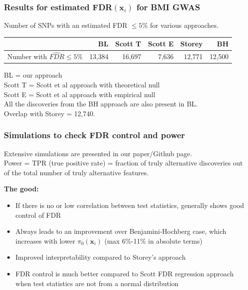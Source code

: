 \documentclass{beamer}
\newcommand{\bx}{\mathbf{x}}
\begin{document}

\begin{frame}
\frametitle{Results for estimated FDR$(\bx_i)$ for BMI GWAS}

Number of  SNPs with an estimated FDR $\le5$\% for various approaches.

\begin{table}[ht]
\begin{tabular}{m{2.2cm}rrrrr}
  \hline
 & BL & Scott T & Scott E & Storey & BH \\ 
  \hline
Number with $\widehat{FDR} \le 5$\%  & 13,384 & 16,697 & 7,636 & 12,771 & 12,500 \\ 
   \hline
\end{tabular}
\end{table}

\vspace{0.5cm}
BL = our approach \\
Scott T = Scott et al approach with theoretical null \\
Scott E = Scott et al approach with empirical null \\

\vspace{0.5cm}
All the discoveries from the BH approach are also present in BL.\\
Overlap with Storey = 12,740.

\end{frame}


\begin{frame}
\frametitle{Simulations to check FDR control and power}

Extensive simulations are presented in our paper/Github page.\\ \vspace{0.2cm}
Power = TPR (true positive rate) = fraction of truly alternative discoveries out of the total number of truly alternative features. \\
\vspace{0.5cm}

\textbf{The good:}

\begin{itemize}
\item If there is no or low correlation between test statistics, generally shows good control of FDR
\item Always leads to an improvement over Benjamini-Hochberg case, which increases with lower $\pi_0(\bx_i)$ (max 6\%-11\% in absolute terms)
\item Improved interpretability compared to Storey's approach
\item FDR control is much better compared to Scott FDR regression approach when test statistics are not from a normal distribution
\end{itemize}

\end{frame}
\end{document}
